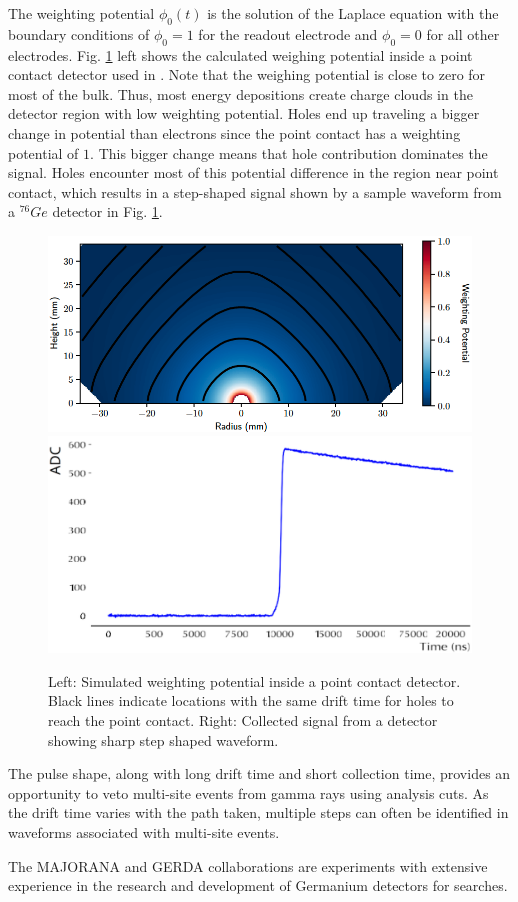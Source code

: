 The weighting potential $\phi_0(t)$ is the solution of the Laplace equation with the boundary conditions of $\phi_0=1$ for the readout electrode and $\phi_0=0$ for all other electrodes. Fig. \ref{fig:wp_signal} left shows the calculated weighing potential inside a point contact detector used in {\MJD}. Note that the weighing potential is close to zero for most of the bulk. Thus, most energy depositions create charge clouds in the detector region with low weighting potential. Holes end up traveling a bigger change in potential than electrons since the point contact has a weighting potential of $1$. This bigger change means that hole contribution dominates the signal. Holes encounter most of this potential difference in the region near point contact, which results in a step-shaped signal shown by a sample waveform from a ${}^{76}Ge$ detector in Fig. \ref{fig:wp_signal}.

  \begin{figure}%
  \centering
  \includegraphics[width=0.55\linewidth]{ch2/figs/ppc_wp.png}
  \includegraphics[width=0.44\linewidth]{ch2/figs/sample_data_wfrm.png}
  \caption{Left: Simulated weighting potential inside a point contact detector. Black lines indicate locations with the same drift time for holes to reach the point contact. Right: Collected signal from a detector showing sharp step shaped waveform.}
    \label{fig:wp_signal}
  \end{figure}

The pulse shape, along with long drift time and short collection time, provides an opportunity to veto multi-site events from gamma rays using analysis cuts. As the drift time varies with the path taken, multiple steps can often be identified in waveforms associated with multi-site events.

The MAJORANA and GERDA collaborations are experiments with extensive experience in the research and development of Germanium detectors for {\onbb} searches.

